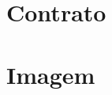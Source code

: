 
\begin{apendicesenv}
  \partapendices
  
  \chapter{Contrato}
  
  \lipsum[50]
  
  \chapter{Imagem}
  \lipsum[55-57]
  
  \end{apendicesenv}
